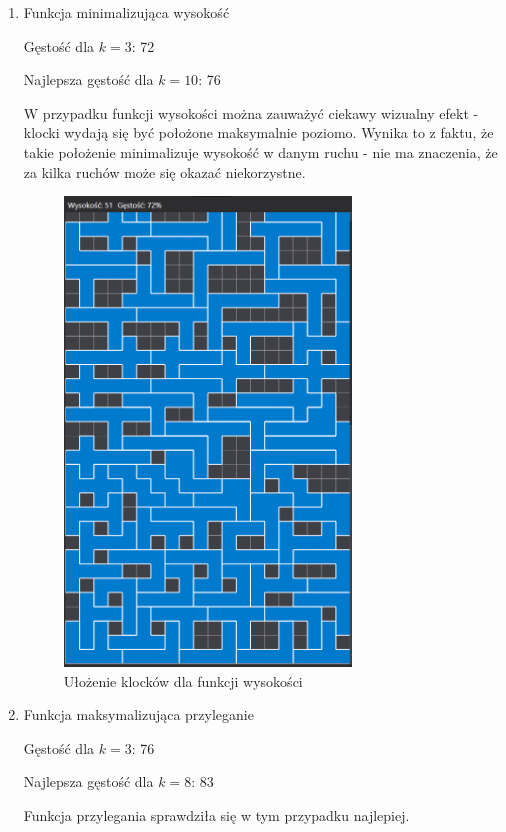 \documentclass{article}
\begin{document}
\begin{enumerate}
\item Funkcja minimalizująca wysokość

Gęstość dla $k=3$: 72

Najlepsza gęstość dla $k=10$: 76

W przypadku funkcji wysokości można zauważyć ciekawy wizualny efekt - klocki wydają się być położone maksymalnie poziomo.
Wynika to z faktu, że takie położenie minimalizuje wysokość w danym ruchu - nie ma znaczenia, że za kilka ruchów może się okazać niekorzystne.

\begin{figure}[H]
\centering
\includegraphics[width=0.72\textwidth]{wysokosc.PNG}
\caption{Ułożenie klocków dla funkcji wysokości}
\end{figure}

\item Funkcja maksymalizująca przyleganie

Gęstość dla $k=3$: 76

Najlepsza gęstość dla $k=8$: 83

Funkcja przylegania sprawdziła się w tym przypadku najlepiej.


\end{enumerate}
\end{document}
